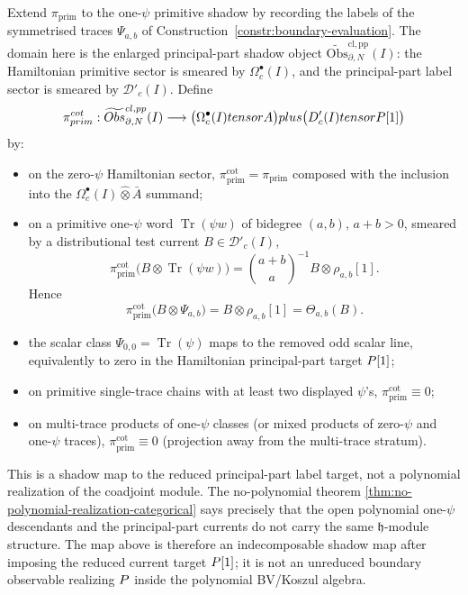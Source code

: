 \begin{constr}\label{constr:chain-level-primitive-cotangent}
  Extend $\pi_{\mathrm{prim}}$ to the one-$\psi$ primitive shadow by
  recording the labels of the symmetrised traces $\Psi_{a,b}$ of
  Construction~\ref{constr:boundary-evaluation}.  The domain here is the
  enlarged principal-part shadow object
  \(\widetilde{\mathrm{Obs}}^{\mathrm{cl,pp}}_{\partial,N}(I)\): the
  Hamiltonian primitive sector is smeared by \(\Omega^\bullet_c(I)\), and
  the principal-part label sector is smeared by
  \(\mathcal D'_c(I)\).  Define
  $$\pi_{prim}^{cot}:
    \widetilde{Obs}^{cl,pp}_{\partial,N}(I)
    \longrightarrow
    \bigl(\Omega^\bullet_c(I)tensorA\bigr)
    plus
    \bigl(D'_c(I)tensorP[1]\bigr)$$
  by:
  \begin{itemize}
    \item on the zero-$\psi$ Hamiltonian sector,
      $\pi_{\mathrm{prim}}^{\mathrm{cot}}=\pi_{\mathrm{prim}}$
      composed with the inclusion into the
      \(\Omega^\bullet_c(I)\widehat\otimes\bar A\) summand;
    \item on a primitive one-$\psi$ word
      \(\operatorname{Tr}(\psi w)\) of bidegree \((a,b)\), \(a+b>0\),
      smeared by a distributional test current \(B\in\mathcal D'_c(I)\),
      \[
        \pi_{\mathrm{prim}}^{\mathrm{cot}}
        \bigl(B\otimes\operatorname{Tr}(\psi w)\bigr)
        =
        \binom{a+b}{a}^{-1} B\otimes\rho_{a,b}[1].
      \]
      Hence
      \[
        \pi_{\mathrm{prim}}^{\mathrm{cot}}\bigl(B\otimes\Psi_{a,b}\bigr)
        =B\otimes\rho_{a,b}[1]
        =\Theta_{a,b}(B).
      \]
    \item the scalar class \(\Psi_{0,0}=\operatorname{Tr}(\psi)\) maps to
      the removed odd scalar line, equivalently to zero in the
      Hamiltonian principal-part target \(P[1]\);
    \item on primitive single-trace chains with at least two displayed
      \(\psi\)'s, \(\pi_{\mathrm{prim}}^{\mathrm{cot}}\equiv0\);
    \item on multi-trace products of one-$\psi$ classes (or mixed
      products of zero-$\psi$ and one-$\psi$ traces),
      $\pi_{\mathrm{prim}}^{\mathrm{cot}}\equiv 0$ (projection away from
      the multi-trace stratum).
  \end{itemize}
	  This is a shadow map to the reduced principal-part label target, not
	  a polynomial realization of the coadjoint module. The
	  no-polynomial theorem \ref{thm:no-polynomial-realization-categorical}
	  says precisely that the open polynomial one-$\psi$ descendants and
	  the principal-part currents do not carry the same
	  $\mathfrak h$-module structure. The map above is therefore an
	  indecomposable shadow map after imposing the reduced current target
	  $P[1]$; it is not an unreduced boundary observable realizing
	  $P$ inside the polynomial BV/Koszul algebra.
\end{constr}

